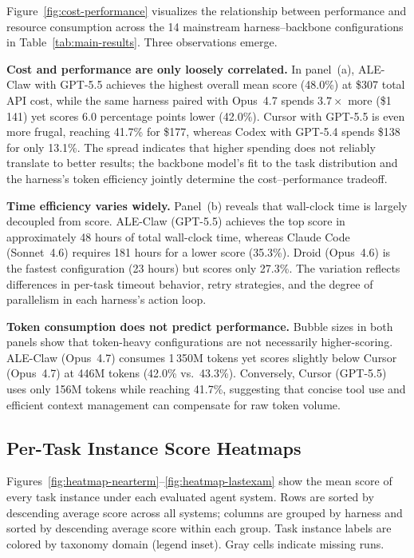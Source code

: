 \documentclass{llmxive}
\begin{document}
Figure~\ref{fig:cost-performance} visualizes the relationship between performance and resource consumption across the 14 mainstream harness--backbone configurations in Table~\ref{tab:main-results}.
Three observations emerge.

\noindent \textbf{Cost and performance are only loosely correlated.}
In panel~(a), ALE-Claw with GPT-5.5 achieves the highest overall mean score (48.0\%) at \$307 total API cost, while the same harness paired with Opus~4.7 spends $3.7\times$ more (\$1\,141) yet scores 6.0 percentage points lower (42.0\%).
Cursor with GPT-5.5 is even more frugal, reaching 41.7\% for \$177, whereas Codex with GPT-5.4 spends \$138 for only 13.1\%.
The spread indicates that higher spending does not reliably translate to better results; the backbone model's fit to the task distribution and the harness's token efficiency jointly determine the cost--performance tradeoff.

\noindent \textbf{Time efficiency varies widely.}
Panel~(b) reveals that wall-clock time is largely decoupled from score.
ALE-Claw (GPT-5.5) achieves the top score in approximately 48 hours of total wall-clock time, whereas Claude Code (Sonnet~4.6) requires 181 hours for a lower score (35.3\%).
Droid (Opus~4.6) is the fastest configuration (23 hours) but scores only 27.3\%.
The variation reflects differences in per-task timeout behavior, retry strategies, and the degree of parallelism in each harness's action loop.

\noindent \textbf{Token consumption does not predict performance.}
Bubble sizes in both panels show that token-heavy configurations are not necessarily higher-scoring.
ALE-Claw (Opus~4.7) consumes 1\,350M tokens yet scores slightly below Cursor (Opus~4.7) at 446M tokens (42.0\% vs.\ 43.3\%).
Conversely, Cursor (GPT-5.5) uses only 156M tokens while reaching 41.7\%, suggesting that concise tool use and efficient context management can compensate for raw token volume.

\subsection{Per-Task Instance Score Heatmaps}
\label{app:per-task-heatmap}

Figures~\ref{fig:heatmap-nearterm}--\ref{fig:heatmap-lastexam} show the mean score of every task instance under each evaluated agent system.
Rows are sorted by descending average score across all systems; columns are grouped by harness and sorted by descending average score within each group.
Task instance labels are colored by taxonomy domain (legend inset).
Gray cells indicate missing runs.
\end{document}
